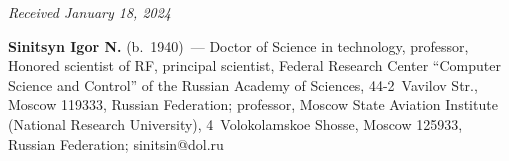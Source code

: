 \vspace*{-6pt}

\hfill{\small\textit{Received January 18, 2024}} 


\Contrl

\vspace*{-3pt}

\noindent
\textbf{Sinitsyn Igor N.} (b.\ 1940)~--- Doctor of Science in technology, professor, Honored scientist of RF, principal scientist, 
Federal Research Center ``Computer Science and Control'' of the Russian Academy of Sciences, 44-2~Vavilov Str., Moscow 119333, 
Russian Federation; professor, Moscow State Aviation Institute (National Research University), 4~Volokolamskoe Shosse, Moscow 125933, Russian Federation; 
\mbox{sinitsin@dol.ru}


\label{end\stat}

\renewcommand{\bibname}{\protect\rm Литература} 